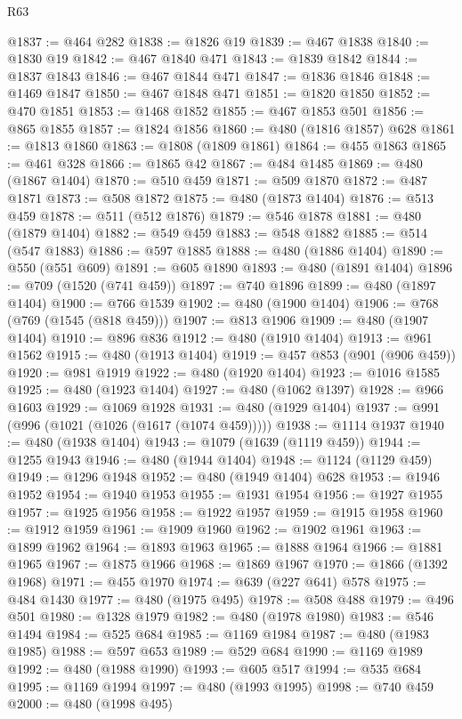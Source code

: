\begin{lexlean}{R63}
\begin{coremodule}
@1837 := @464 @282
@1838 := @1826 @19
@1839 := @467 @1838
@1840 := @1830 @19
@1842 := @467 @1840 @471
@1843 := @1839 @1842
@1844 := @1837 @1843
@1846 := @467 @1844 @471
@1847 := @1836 @1846
@1848 := @1469 @1847
@1850 := @467 @1848 @471
@1851 := @1820 @1850
@1852 := @470 @1851
@1853 := @1468 @1852
@1855 := @467 @1853 @501
@1856 := @865 @1855
@1857 := @1824 @1856
@1860 := @480 (@1816 @1857) @628
@1861 := @1813 @1860
@1863 := @1808 (@1809 @1861)
@1864 := @455 @1863
@1865 := @461 @328
@1866 := @1865 @42
@1867 := @484 @1485
@1869 := @480 (@1867 @1404)
@1870 := @510 @459
@1871 := @509 @1870
@1872 := @487 @1871
@1873 := @508 @1872
@1875 := @480 (@1873 @1404)
@1876 := @513 @459
@1878 := @511 (@512 @1876)
@1879 := @546 @1878
@1881 := @480 (@1879 @1404)
@1882 := @549 @459
@1883 := @548 @1882
@1885 := @514 (@547 @1883)
@1886 := @597 @1885
@1888 := @480 (@1886 @1404)
@1890 := @550 (@551 @609)
@1891 := @605 @1890
@1893 := @480 (@1891 @1404)
@1896 := @709 (@1520 (@741 @459))
@1897 := @740 @1896
@1899 := @480 (@1897 @1404)
@1900 := @766 @1539
@1902 := @480 (@1900 @1404)
@1906 := @768 (@769 (@1545 (@818 @459)))
@1907 := @813 @1906
@1909 := @480 (@1907 @1404)
@1910 := @896 @836
@1912 := @480 (@1910 @1404)
@1913 := @961 @1562
@1915 := @480 (@1913 @1404)
@1919 := @457 @853 (@901 (@906 @459))
@1920 := @981 @1919
@1922 := @480 (@1920 @1404)
@1923 := @1016 @1585
@1925 := @480 (@1923 @1404)
@1927 := @480 (@1062 @1397)
@1928 := @966 @1603
@1929 := @1069 @1928
@1931 := @480 (@1929 @1404)
@1937 := @991 (@996 (@1021 (@1026 (@1617 (@1074 @459)))))
@1938 := @1114 @1937
@1940 := @480 (@1938 @1404)
@1943 := @1079 (@1639 (@1119 @459))
@1944 := @1255 @1943
@1946 := @480 (@1944 @1404)
@1948 := @1124 (@1129 @459)
@1949 := @1296 @1948
@1952 := @480 (@1949 @1404) @628
@1953 := @1946 @1952
@1954 := @1940 @1953
@1955 := @1931 @1954
@1956 := @1927 @1955
@1957 := @1925 @1956
@1958 := @1922 @1957
@1959 := @1915 @1958
@1960 := @1912 @1959
@1961 := @1909 @1960
@1962 := @1902 @1961
@1963 := @1899 @1962
@1964 := @1893 @1963
@1965 := @1888 @1964
@1966 := @1881 @1965
@1967 := @1875 @1966
@1968 := @1869 @1967
@1970 := @1866 (@1392 @1968)
@1971 := @455 @1970
@1974 := @639 (@227 @641) @578
@1975 := @484 @1430
@1977 := @480 (@1975 @495)
@1978 := @508 @488
@1979 := @496 @501
@1980 := @1328 @1979
@1982 := @480 (@1978 @1980)
@1983 := @546 @1494
@1984 := @525 @684
@1985 := @1169 @1984
@1987 := @480 (@1983 @1985)
@1988 := @597 @653
@1989 := @529 @684
@1990 := @1169 @1989
@1992 := @480 (@1988 @1990)
@1993 := @605 @517
@1994 := @535 @684
@1995 := @1169 @1994
@1997 := @480 (@1993 @1995)
@1998 := @740 @459
@2000 := @480 (@1998 @495)

\end{coremodule}
\end{lexlean}
